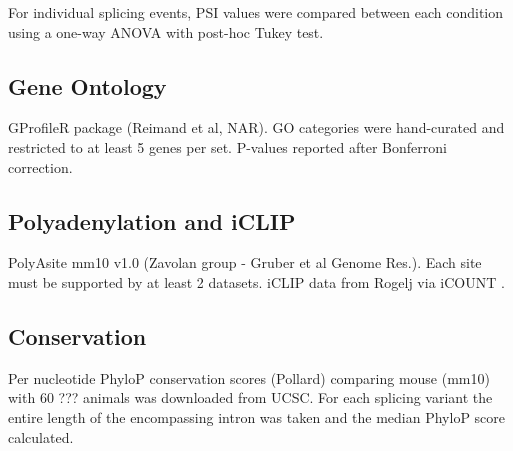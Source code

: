 For individual splicing events, PSI values were compared between each condition using a one-way ANOVA with post-hoc Tukey test.

\subsection{Gene Ontology}
GProfileR package (Reimand et al, NAR). GO categories were hand-curated and restricted to at least 5 genes per set. P-values reported after Bonferroni correction. 

\subsection{Polyadenylation and iCLIP}
PolyAsite mm10 v1.0 (Zavolan group - Gruber et al Genome Res.). Each site must be supported by at least 2 datasets.
iCLIP data from Rogelj via iCOUNT .

\subsection{Conservation}
Per nucleotide PhyloP conservation scores (Pollard) comparing mouse (mm10) with 60 ??? animals was downloaded from UCSC. For each splicing variant the entire length of the encompassing intron was taken and the median PhyloP score calculated.

\clearpage



